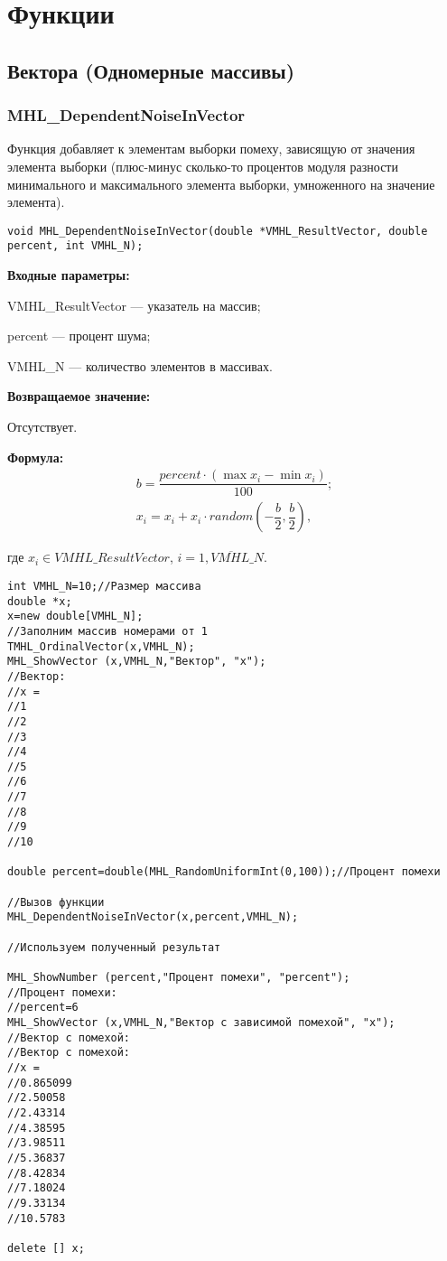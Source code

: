 \documentclass[a4paper,12pt]{article}
\begin{document}
\newpage
\section{Функции}
\subsection{Вектора (Одномерные массивы)}

\subsubsection{MHL\_DependentNoiseInVector}\label{MHL_DependentNoiseInVector}

Функция добавляет к элементам выборки помеху, зависящую от значения элемента выборки (плюс-минус сколько-то процентов модуля разности минимального и максимального элемента выборки, умноженного на значение элемента).


\begin{lstlisting}[label=code_syntax_MHL_DependentNoiseInVector,caption=Синтаксис]
void MHL_DependentNoiseInVector(double *VMHL_ResultVector, double percent, int VMHL_N);
\end{lstlisting}

\textbf{Входные параметры:}  

 VMHL\_ResultVector --- указатель на массив;
 
 percent --- процент шума;
 
 VMHL\_N --- количество элементов в массивах.

\textbf{Возвращаемое значение:}

Отсутствует.

\textbf{Формула:}
\begin{eqnarray*}
b=\dfrac{percent\cdot\left( \max{x_i}-\min{x_i}\right)}{100};\\
x_i=x_i+x_i\cdot random \left( -\dfrac{b}{2},\dfrac{b}{2}\right),
\end{eqnarray*}

где $x_i \in VMHL\_ResultVector$, $i=\overline{1,VMHL\_N}$.


\begin{lstlisting}[label=code_use_MHL_DependentNoiseInVector,caption=Пример использования]
int VMHL_N=10;//Размер массива
double *x;
x=new double[VMHL_N];
//Заполним массив номерами от 1
TMHL_OrdinalVector(x,VMHL_N);
MHL_ShowVector (x,VMHL_N,"Вектор", "x");
//Вектор:
//x =	
//1
//2
//3
//4
//5
//6
//7
//8
//9
//10

double percent=double(MHL_RandomUniformInt(0,100));//Процент помехи

//Вызов функции
MHL_DependentNoiseInVector(x,percent,VMHL_N);

//Используем полученный результат

MHL_ShowNumber (percent,"Процент помехи", "percent");
//Процент помехи:
//percent=6
MHL_ShowVector (x,VMHL_N,"Вектор с зависимой помехой", "x");
//Вектор с помехой:
//Вектор с помехой:
//x =	
//0.865099
//2.50058
//2.43314
//4.38595
//3.98511
//5.36837
//8.42834
//7.18024
//9.33134
//10.5783

delete [] x;
\end{lstlisting}
\end{document}
